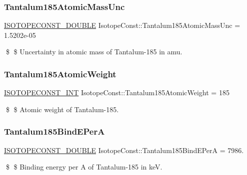 \subsubsection{\texorpdfstring{Tantalum185\+Atomic\+Mass\+Unc}{Tantalum185AtomicMassUnc}}
{\footnotesize\ttfamily \mbox{\hyperlink{group___isotope_const-_macros_ga8f45a7272ce02c0b4c65c44636ed719a}{I\+S\+O\+T\+O\+P\+E\+C\+O\+N\+S\+T\+\_\+\+D\+O\+U\+B\+LE}} Isotope\+Const\+::\+Tantalum185\+Atomic\+Mass\+Unc = 1.\+5202e-\/05}

\$ \$ Uncertainty in atomic mass of Tantalum-\/185 in amu. \mbox{\label{group___isotope_const-_tantalum-_ta185_ga0c2746dc8a3db71ebef5790a800468ca}} 
\subsubsection{\texorpdfstring{Tantalum185\+Atomic\+Weight}{Tantalum185AtomicWeight}}
{\footnotesize\ttfamily \mbox{\hyperlink{group___isotope_const-_macros_ga5f18360b3e99483a35c32d789e62621c}{I\+S\+O\+T\+O\+P\+E\+C\+O\+N\+S\+T\+\_\+\+I\+NT}} Isotope\+Const\+::\+Tantalum185\+Atomic\+Weight = 185}

\$ \$ Atomic weight of Tantalum-\/185. \mbox{\label{group___isotope_const-_tantalum-_ta185_gaac25538b85365b9fe39a194f5437e310}} 
\subsubsection{\texorpdfstring{Tantalum185\+Bind\+E\+PerA}{Tantalum185BindEPerA}}
{\footnotesize\ttfamily \mbox{\hyperlink{group___isotope_const-_macros_ga8f45a7272ce02c0b4c65c44636ed719a}{I\+S\+O\+T\+O\+P\+E\+C\+O\+N\+S\+T\+\_\+\+D\+O\+U\+B\+LE}} Isotope\+Const\+::\+Tantalum185\+Bind\+E\+PerA = 7986.}

\$ \$ Binding energy per A of Tantalum-\/185 in keV. \mbox{\label{group___isotope_const-_tantalum-_ta185_gae15377de0788a27a8a36ee3a4668c3ff}} 
